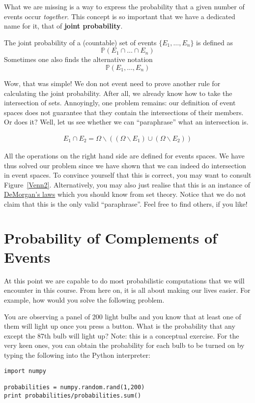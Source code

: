 What we are missing is a way to express the probability that a given number of events occur 
\textit{together}. This concept is so important that we have a dedicated name for it, that of 
\textbf{joint probability}.

\begin{Definition}
The joint probability of a (countable) set of events $ \{E_{1}, \ldots, E_{n}\} $ is defined as
$$ \mathbb{P}(E_{1} \cap \ldots \cap E_{n}) $$
Sometimes one also finds the alternative notation 
$$ \mathbb{P}(E_{1}, \ldots, E_{n}) $$
\end{Definition}

Wow, that was simple! We don not event need to prove another rule for calculating the joint probability.
After all, we already know how to take the intersection of sets. Annoyingly, one problem remains: our
definition of event spaces does not guarantee that they contain the intersections of their members. Or does 
it? Well, let us see whether we can ``paraphrase'' what an intersection is.

\begin{align}
E_{1} \cap E_{2} = \Omega \backslash ((\Omega \backslash E_{1}) \cup (\Omega \backslash E_{2}))
\end{align}

All the operations on the right hand side are defined for events spaces. We have thus solved our problem since
we have shown that we can indeed do intersection in event spaces.
To convince yourself that this is correct, you may want to consult Figure~\ref{Venn2}. Alternatively, you
may also just realise that this is an instance of \href{https://en.wikipedia.org/wiki/De_Morgan's_laws}
{DeMorgan's laws} which you should know from set theory. Notice that we do not claim that this is the only 
valid ``paraphrase''. Feel free to find others, if you like!




\section{Probability of Complements of Events}
At this point we are capable to do most probabilistic computations that we will encounter in this course.
From here on, it is all about making our lives easier. For example, how would you solve the following 
problem.

\begin{Exercise}
You are observing a panel of 200 light bulbs and you know that at least one of them will light up once you 
press a button. What is the probability that any except the 87th bulb will light up? Note: this is a 
conceptual exercise. For the very keen ones, you can obtain the probability for each bulb to be turned on
by typing the following into the Python interpreter:

\begin{lstlisting}
import numpy

probabilities = numpy.random.rand(1,200)
print probabilities/probabilities.sum()
\end{lstlisting} 
\end{Exercise}

